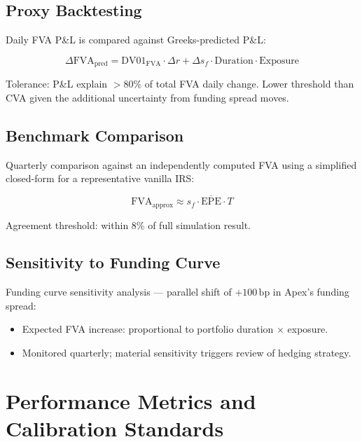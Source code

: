 \documentclass[11pt,a4paper]{article}
\begin{document}
\subsection{Proxy Backtesting}

Daily FVA P\&L is compared against Greeks-predicted P\&L:

\begin{equation}
\Delta\mathrm{FVA}_{\mathrm{pred}} = \mathrm{DV01}_{\mathrm{FVA}} \cdot \Delta r
  + \Delta s_f \cdot \mathrm{Duration} \cdot \mathrm{Exposure}
\tag{6}
\end{equation}

Tolerance: P\&L explain $> 80\%$ of total FVA daily change. Lower threshold than CVA given the
additional uncertainty from funding spread moves.

\subsection{Benchmark Comparison}

Quarterly comparison against an independently computed FVA using a simplified closed-form for
a representative vanilla IRS:

\begin{equation}
\mathrm{FVA}_{\mathrm{approx}} \approx s_f \cdot \overline{\mathrm{EPE}} \cdot T
\tag{7}
\end{equation}

Agreement threshold: within 8\% of full simulation result.

\subsection{Sensitivity to Funding Curve}

Funding curve sensitivity analysis --- parallel shift of $+100\,\mathrm{bp}$ in Apex's funding
spread:
\begin{itemize}[leftmargin=*]
  \item Expected FVA increase: proportional to portfolio duration $\times$ exposure.
  \item Monitored quarterly; material sensitivity triggers review of hedging strategy.
\end{itemize}

\section{Performance Metrics and Calibration Standards}
\end{document}
